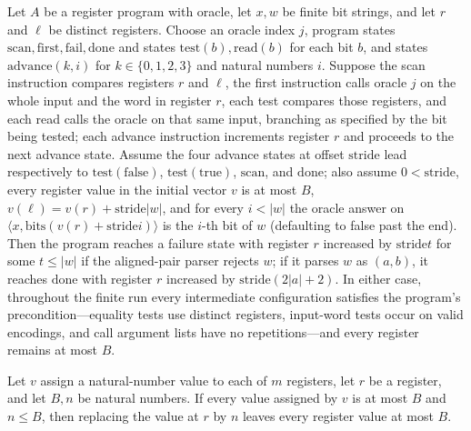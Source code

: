 \begin{theorem}
\label{Complexity.LogProg.alignedPair_loop}
\leanok
{}
Let $A$ be a register program with oracle, let $x,w$ be finite bit strings, and let $r$
and $\ell$ be distinct registers. Choose an oracle index $j$, program states
$\mathrm{scan},\mathrm{first},\mathrm{fail},\mathrm{done}$ and states
$\mathrm{test}(b),\mathrm{read}(b)$ for each bit $b$, and states $\mathrm{advance}(k,i)$
for $k\in\{0,1,2,3\}$ and natural numbers $i$. Suppose the scan instruction compares
registers $r$ and $\ell$, the first instruction calls oracle $j$ on the whole input and
the word in register $r$, each test compares those registers, and each read calls the
oracle on that same input, branching as specified by the bit being tested; each advance
instruction increments register $r$ and proceeds to the next advance state. Assume the
four advance states at offset $\mathrm{stride}$ lead respectively to
$\mathrm{test}(\mathrm{false})$, $\mathrm{test}(\mathrm{true})$, $\mathrm{scan}$, and
$\mathrm{done}$; also assume $0<\mathrm{stride}$, every register value in the initial
vector $v$ is at most $B$, $v(\ell)=v(r)+\mathrm{stride}|w|$, and for every $i<|w|$ the
oracle answer on $\langle x,\mathrm{bits}(v(r)+\mathrm{stride}i)\rangle$ is the $i$-th
bit of $w$ (defaulting to false past the end). Then the program reaches a failure state
with register $r$ increased by $\mathrm{stride}t$ for some $t\le |w|$ if the
aligned-pair parser rejects $w$; if it parses $w$ as $(a,b)$, it reaches $\mathrm{done}$
with register $r$ increased by $\mathrm{stride}(2|a|+2)$. In either case, throughout the
finite run every intermediate configuration satisfies the program's
precondition—equality tests use distinct registers, input-word tests occur on valid
encodings, and call argument lists have no repetitions—and every register remains at
most $B$.
\end{theorem}

\begin{theorem}
\label{Complexity.LogProg.register_update_le}
\leanok
{}
Let $v$ assign a natural-number value to each of $m$ registers, let $r$ be a register,
and let $B,n$ be natural numbers. If every value assigned by $v$ is at most $B$ and
$n\leq B$, then replacing the value at $r$ by $n$ leaves every register value at most
$B$.
\end{theorem}

